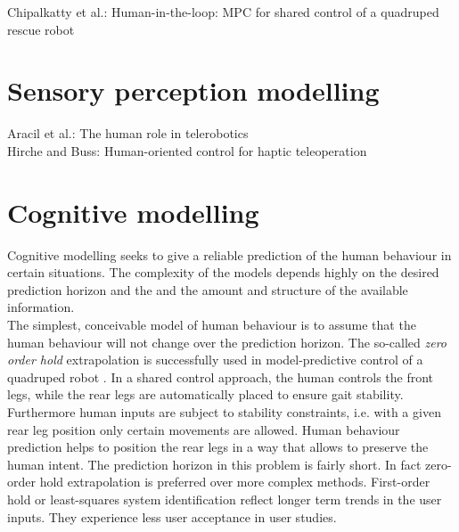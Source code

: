 \documentclass[a4paper,twoside, openright,12pt]{report}
\begin{document}

Chipalkatty et al.: Human-in-the-loop: MPC for shared control of a quadruped rescue robot      
\section{Sensory perception modelling}
Aracil et al.: The human role in telerobotics\\
Hirche and Buss: Human-oriented control for haptic teleoperation
\section{Cognitive modelling}
Cognitive modelling seeks to give a reliable prediction of the human behaviour in certain situations. The complexity of the models depends highly on the desired prediction horizon and the and the amount and structure of the available information.\\
The simplest, conceivable model of human behaviour is to assume that the human behaviour will not change over the prediction horizon. The so-called \emph{zero order hold} extrapolation is successfully used in model-predictive control of a quadruped robot \cite{Chipalkatty13}. In a shared control approach, the human controls the front legs, while the rear legs are automatically placed to ensure gait stability. Furthermore human inputs are subject to stability constraints, i.e. with a given rear leg position only certain movements are allowed. Human behaviour prediction helps to position the rear legs in a way that allows to preserve the human intent. The prediction horizon in this problem is fairly short. In fact zero-order hold extrapolation is preferred over more complex methods. First-order hold or least-squares system identification reflect longer term trends in the user inputs. They experience less user acceptance in user studies.\\
\end{document}
